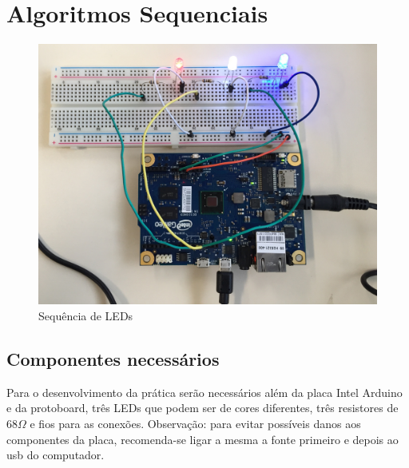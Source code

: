 %
%
%
\chapter{Algoritmos Sequenciais}
\label{intro} %


\begin{figure}[h]
\centering
\includegraphics[scale=0.12]{chapter2/real.jpg}
\caption{Sequência de LEDs}
\label{fig:1}
\end{figure}

\section{Componentes necessários}
\label{sec:1}

Para o desenvolvimento da prática serão necessários além da placa Intel Arduino e da protoboard, três LEDs que podem ser de cores diferentes, três resistores de 68$\Omega$ e fios para as conexões.
Observação: para evitar possíveis danos aos componentes da placa, recomenda-se ligar a mesma a fonte primeiro e depois ao usb do computador. 

